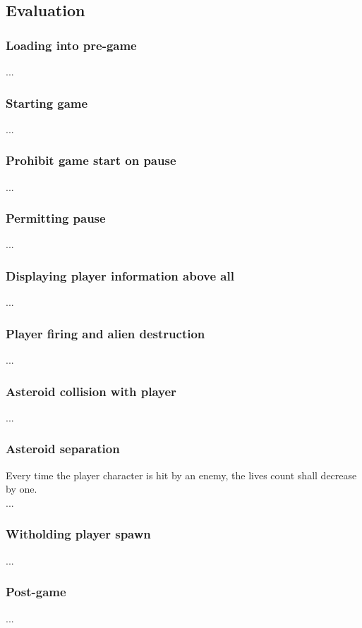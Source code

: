 \documentclass[12pt, titlepage]{article}
\begin{document}
\subsection{Evaluation}
\subsubsection{Loading into pre-game}
...\\
\subsubsection{Starting game}
...\\
\subsubsection{Prohibit game start on pause}
...\\
\subsubsection{Permitting pause}
...\\
\subsubsection{Displaying player information above all}
...\\
\subsubsection{Player firing and alien destruction}
...\\
\subsubsection{Asteroid collision with player}
...\\
\subsubsection{Asteroid separation}
Every time the player character is hit by an enemy, the lives count shall decrease by one.\\
...\\
\subsubsection{Witholding player spawn}
...\\
\subsubsection{Post-game}
...\\
\end{document}
